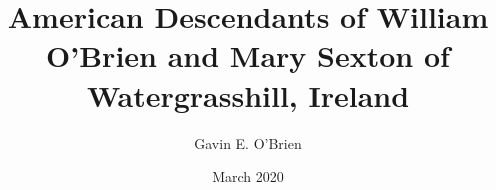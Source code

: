 \documentclass[oneside,letterpaper,12pt]{memoir}
\begin{document}
\author{Gavin E. O'Brien}
\title{American Descendants of William O'Brien and Mary Sexton of Watergrasshill, Ireland}
\date{March 2020}

\maketitle
\tableofcontents

%




\end{document}
